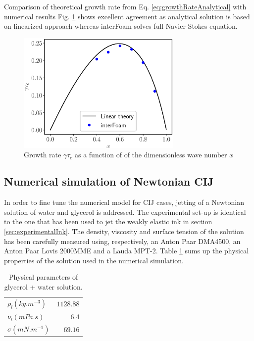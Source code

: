 \documentclass[twocolumn,10pt]{asme2ej}
\begin{document}
Comparison of theoretical growth rate from Eq. \ref{eq:growthRateAnalytical} with numerical results Fig. \ref{fig:growthrate} shows excellent agreement as analytical solution is based on linearized approach whereas interFoam solves full Navier-Stokes equation.

\begin{figure}[h]
    \centering
    \includegraphics[width=8cm]{dispersion.eps}
    \caption{Growth rate $\gamma \tau_c$ as a function of of the dimensionless wave number $x$}
    \label{fig:growthrate}
\end{figure}

\subsection{Numerical simulation of Newtonian CIJ}\label{sec:glycerol}
In order to fine tune the numerical model for CIJ cases, jetting of a Newtonian solution of water and glycerol is addressed. The experimental set-up is identical to the one that has been used to jet the weakly elastic ink in section \ref{sec:experimentalInk}. The density, viscosity and surface tension of the solution has been carefully measured using, respectively, an Anton Paar DMA4500, an Anton Paar Lovis 2000MME and a Lauda MPT-2. Table \ref{tab:parametersGlycerol} sums up the physical properties of the solution used in the numerical simulation.

\begin{table}
    \begin{center}
        \begin{tabular}{lr}
            \hline
            $\rho_{l} (kg.m^{-3})$ & $1128.88$\\
            $\nu_{l} (mPa.s)$ & $6.4$\\
            $\sigma (mN.m^{-1})$ & $69.16$\\
            \hline
        \end{tabular}
    \end{center}
    
    \caption{\label{tab:parametersGlycerol} Physical parameters of glycerol + water solution.}
\end{table}
\end{document}
